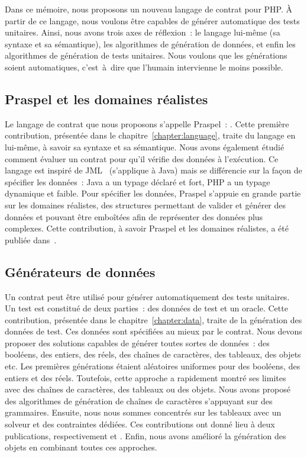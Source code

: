 Dans ce mémoire, nous proposons un nouveau langage de contrat pour PHP. À partir
de ce langage, nous voulons être capables de générer automatique des tests
unitaires. Ainsi, nous avons trois axes de réflexion~: le langage lui-même (sa
syntaxe et sa sémantique), les algorithmes de génération de données, et enfin
les algorithmes de génération de tests unitaires. Nous voulons que les
générations soient automatiques, c'est~à~dire que l'humain intervienne le moins
possible.

\subsection{Praspel et les domaines réalistes}

Le langage de contrat que nous proposons s'appelle {\strong Praspel}~:
. Cette première
contribution, présentée dans le chapitre~\ref{chapter:language}, traite du
langage en lui-même, à savoir sa syntaxe et sa sémantique. Nous avons également
étudié comment évaluer un contrat pour qu'il vérifie des données à l'exécution.
Ce langage est inspiré de JML~ (s'applique à Java) mais se
différencie sur la façon de spécifier les données~: Java a un typage déclaré et
fort, PHP a un typage dynamique et faible. Pour spécifier les données, Praspel
s'appuie en grande partie sur les {\strong domaines réalistes}, des structures
permettant de valider et générer des données et pouvant être emboîtées afin de
représenter des données plus complexes. Cette contribution, à savoir Praspel et
les domaines réalistes, a été publiée dans~.

\subsection{Générateurs de données}

Un contrat peut être utilisé pour générer automatiquement des tests unitaires.
Un test est constitué de deux parties~: des données de test et un oracle. Cette
contribution, présentée dans le chapitre~\ref{chapter:data}, traite de la
génération des données de test. Ces données sont spécifiées au mieux par le
contrat. Nous devons proposer des solutions capables de générer toutes sortes de
données~: des booléens, des entiers, des réels, des chaînes de caractères, des
tableaux, des objets etc. Les premières générations étaient aléatoires uniformes
pour des booléens, des entiers et des réels. Toutefois, cette approche a
rapidement montré ses limites avec des chaînes de caractères, des tableaux ou
des objets. Nous avons proposé des algorithmes de génération de chaînes de
caractères s'appuyant sur des grammaires. Ensuite, nous nous sommes concentrés
sur les tableaux avec un solveur et des contraintes dédiées. Ces contributions
ont donné lieu à deux publications, respectivement  et
. Enfin, nous avons amélioré la génération des objets en
combinant toutes ces approches.

